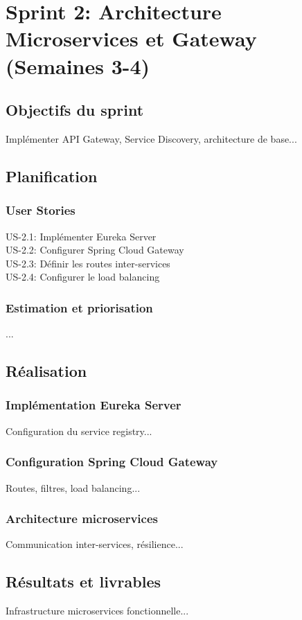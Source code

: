 \documentclass[12pt,a4paper]{report}
\begin{document}
\section{Sprint 2: Architecture Microservices et Gateway (Semaines 3-4)}
\subsection{Objectifs du sprint}
Implémenter API Gateway, Service Discovery, architecture de base...

\subsection{Planification}
\subsubsection{User Stories}
US-2.1: Implémenter Eureka Server \\
US-2.2: Configurer Spring Cloud Gateway \\
US-2.3: Définir les routes inter-services \\
US-2.4: Configurer le load balancing

\subsubsection{Estimation et priorisation}
...

\subsection{Réalisation}
\subsubsection{Implémentation Eureka Server}
Configuration du service registry...

\subsubsection{Configuration Spring Cloud Gateway}
Routes, filtres, load balancing...

\subsubsection{Architecture microservices}
Communication inter-services, résilience...

\subsection{Résultats et livrables}
Infrastructure microservices fonctionnelle...
\end{document}
